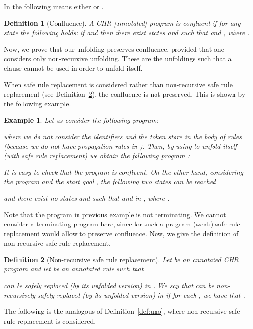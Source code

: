 \documentclass{tlp}
\newtheorem{definition}{Definition} \newtheorem{proposition}{Proposition} \newtheorem{example}{Example} \newtheorem{corollary}{Corollary} \newtheorem{theorem}{Theorem} \newtheorem{lemma}{Lemma}
\begin{document}
In the following  means either  or .


\begin{definition}[{\sc Confluence}]\label{def:Conf}
A CHR [annotated] program is \emph{confluent} if for any state  the following holds:
if  and  then there exist states 
and  such that  and , where .
\end{definition}

Now, we prove that our unfolding preserves confluence, provided that one considers only non-recursive unfolding. These
are the unfoldings such that a clause  cannot be used in order to unfold    itself.

When safe rule replacement is considered  rather than  non-recursive safe rule replacement (see Definition~\ref{def:nrsafedel}),
the confluence is not preserved. This is shown by the following example.

\begin{example}\label{ex:cofluence-problem}
Let us consider the following program:

where we do not consider the identifiers and the token store in the
body of rules (because we do not have propagation rules in ).
Then, by using  to unfold  itself (with safe rule replacement) we obtain the following program :

It is easy to check that the program  is confluent.
On the other hand, considering the program  and the start goal , the following  two states can be reached

and
there exist no states 
and  such that  and  in , where .\end{example}

Note that the program in previous example is not terminating. 
We cannot consider a terminating program here, since for such a program (weak) safe rule replacement would allow to preserve confluence.
Now, we give the definition of non-recursive safe rule replacement.

\begin{definition}[{\sc Non-recursive safe rule replacement}]\label{def:nrsafedel}
Let  be an annotated CHR program and let  be an annotated rule such that

can be safely replaced (by its unfolded version) in .
We say that 
can be non-recursively safely replaced (by its unfolded version) in  if
for each  , we have that
.
\end{definition}

The following is the analogous of Definition~\ref{def:uno}, where non-recursive safe rule replacement is considered.
\end{document}
